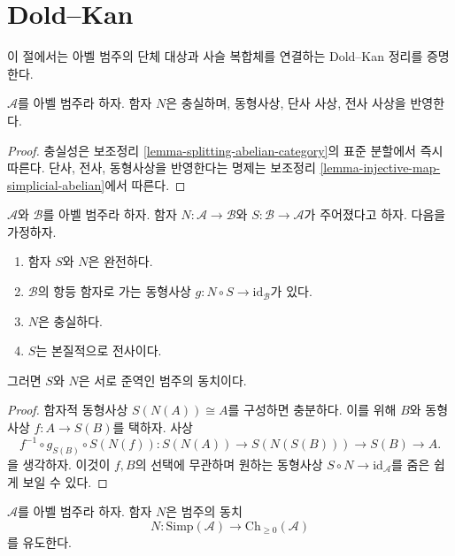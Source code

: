 \section{Dold--Kan}
\label{section-dold-kan}

\noindent
이 절에서는 아벨 범주의 단체 대상과 사슬 복합체를 연결하는
Dold--Kan 정리를 증명한다.

\begin{lemma}
\label{lemma-N-faithful}
$\mathcal{A}$를 아벨 범주라 하자. 함자 $N$은 충실하며, 동형사상,
단사 사상, 전사 사상을 반영한다.
\end{lemma}

\begin{proof}
충실성은 보조정리 \ref{lemma-splitting-abelian-category}의 표준 분할에서
즉시 따른다. 단사, 전사, 동형사상을 반영한다는 명제는 보조정리
\ref{lemma-injective-map-simplicial-abelian}에서 따른다.
\end{proof}

\begin{lemma}
\label{lemma-S-N}
$\mathcal{A}$와 $\mathcal{B}$를 아벨 범주라 하자. 함자
$N : \mathcal{A} \to \mathcal{B}$와 $S : \mathcal{B} \to \mathcal{A}$가
주어졌다고 하자. 다음을 가정하자.
\begin{enumerate}
\item 함자 $S$와 $N$은 완전하다.
\item $\mathcal{B}$의 항등 함자로 가는 동형사상
$g : N \circ S \to \text{id}_\mathcal{B}$가 있다.
\item $N$은 충실하다.
\item $S$는 본질적으로 전사이다.
\end{enumerate}
그러면 $S$와 $N$은 서로 준역인 범주의 동치이다.
\end{lemma}

\begin{proof}
함자적 동형사상 $S(N(A)) \cong A$를 구성하면 충분하다.
이를 위해 $B$와 동형사상 $f : A  \to S(B)$를 택하자. 사상
$$
f^{-1} \circ g_{S(B)} \circ S(N(f)) :
S(N(A)) \to S(N(S(B))) \to S(B) \to A.
$$
을 생각하자. 이것이 $f, B$의 선택에 무관하며 원하는 동형사상
$S \circ N \to \text{id}_\mathcal{A}$를 줌은 쉽게 보일 수 있다.
\end{proof}

\begin{theorem}
\label{theorem-dold-kan}
$\mathcal{A}$를 아벨 범주라 하자. 함자 $N$은 범주의 동치
$$
N :
\text{Simp}(\mathcal{A})
\longrightarrow
\text{Ch}_{\geq 0}(\mathcal{A})
$$
를 유도한다.
\end{theorem}


